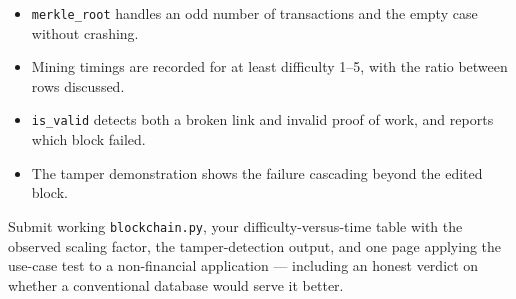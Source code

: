 \begin{verification}
\begin{itemize}
  \item \texttt{merkle\_root} handles an odd number of transactions and the empty case without crashing.
  \item Mining timings are recorded for at least difficulty 1--5, with the ratio between rows discussed.
  \item \texttt{is\_valid} detects both a broken link and invalid proof of work, and reports which block failed.
  \item The tamper demonstration shows the failure cascading beyond the edited block.
\end{itemize}
\end{verification}

\begin{labdeliverable}
Submit working \texttt{blockchain.py}, your difficulty-versus-time table with the observed scaling factor, the tamper-detection output, and one page applying the use-case test to a non-financial application --- including an honest verdict on whether a conventional database would serve it better.
\end{labdeliverable}
